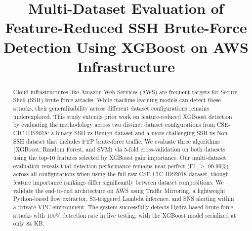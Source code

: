 \documentclass[conference]{IEEEtran}
\begin{document}
\title{Multi-Dataset Evaluation of Feature-Reduced SSH Brute-Force Detection Using XGBoost on AWS Infrastructure}

\author{
\and
{}
\and
{}
\and
{}
}

\maketitle

\begin{abstract}
Cloud infrastructures like Amazon Web Services (AWS) are frequent targets for Secure Shell (SSH) brute-force attacks. While machine learning models can detect these attacks, their generalizability across different dataset configurations remains underexplored. This study extends prior work on feature-reduced XGBoost detection by evaluating the methodology across two distinct dataset configurations from CSE-CIC-IDS2018: a binary SSH-vs-Benign dataset and a more challenging SSH-vs-Non-SSH dataset that includes FTP brute-force traffic. We evaluate three algorithms (XGBoost, Random Forest, and SVM) via 5-fold cross-validation on both datasets using the top-10 features selected by XGBoost gain importance. Our multi-dataset evaluation reveals that detection performance remains near-perfect (F1 $\geq$ 99.99\%) across all configurations when using the full raw CSE-CIC-IDS2018 dataset, though feature importance rankings differ significantly between dataset compositions. We validate the end-to-end architecture on AWS using Traffic Mirroring, a lightweight Python-based flow extractor, S3-triggered Lambda inference, and SNS alerting within a private VPC environment. The system successfully detects Hydra-based brute-force attacks with 100\% detection rate in live testing, with the XGBoost model serialized at only 84 KB.
\end{abstract}
\end{document}

